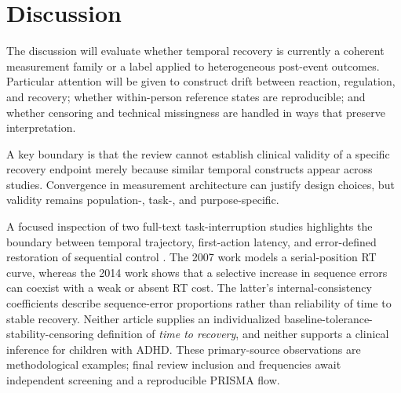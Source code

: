 \section{Discussion}

The discussion will evaluate whether temporal recovery is currently a coherent measurement family or a label applied to heterogeneous post-event outcomes. Particular attention will be given to construct drift between reaction, regulation, and recovery; whether within-person reference states are reproducible; and whether censoring and technical missingness are handled in ways that preserve interpretation.

A key boundary is that the review cannot establish clinical validity of a specific recovery endpoint merely because similar temporal constructs appear across studies. Convergence in measurement architecture can justify design choices, but validity remains population-, task-, and purpose-specific.

A focused inspection of two full-text task-interruption studies highlights the boundary between temporal trajectory, first-action latency, and error-defined restoration of sequential control \parencite{altmann2007timecourse,altmann2014momentary}. The 2007 work models a serial-position RT curve, whereas the 2014 work shows that a selective increase in sequence errors can coexist with a weak or absent RT cost. The latter's internal-consistency coefficients describe sequence-error proportions rather than reliability of time to stable recovery. Neither article supplies an individualized baseline-tolerance-stability-censoring definition of \emph{time to recovery}, and neither supports a clinical inference for children with ADHD. These primary-source observations are methodological examples; final review inclusion and frequencies await independent screening and a reproducible PRISMA flow.
